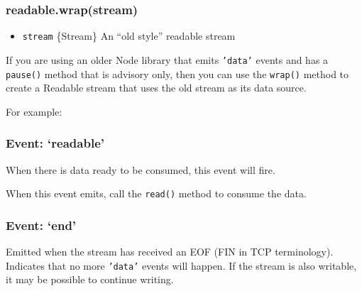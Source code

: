 \subsubsection{readable.wrap(stream)}

\begin{itemize}
\item
  \texttt{stream} \{Stream\} An ``old style'' readable stream
\end{itemize}

If you are using an older Node library that emits \texttt{'data'} events
and has a \texttt{pause()} method that is advisory only, then you can
use the \texttt{wrap()} method to create a Readable stream that uses the
old stream as its data source.

For example:

\begin{Shaded}
\begin{Highlighting}[]
 \NormalTok{;}
  
 \NormalTok{;}
  

\NormalTok{(}\NormalTok{, }\NormalTok{() \{}
  \NormalTok{(); }
\NormalTok{\});}
\end{Highlighting}
\end{Shaded}

\subsubsection{Event: `readable'}

When there is data ready to be consumed, this event will fire.

When this event emits, call the \texttt{read()} method to consume the
data.

\subsubsection{Event: `end'}

Emitted when the stream has received an EOF (FIN in TCP terminology).
Indicates that no more \texttt{'data'} events will happen. If the stream
is also writable, it may be possible to continue writing.

